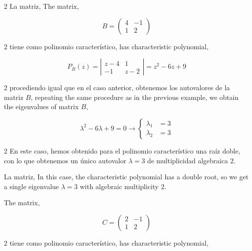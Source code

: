 \begin{paracol}{2}
La matriz,
\switchcolumn
The matrix,
\end{paracol}
\begin{equation*}
B=\begin{pmatrix}
4& -1\\
1& 2
\end{pmatrix}
\end{equation*}
\begin{paracol}{2}
tiene como polinomio característico,
\switchcolumn
has characteristic polynomial, 
\end{paracol}
\begin{equation*}
P_B(z)=\left\vert\begin{matrix}
z-4& 1\\
-1& z-2 
\end{matrix} \right\vert=z^2-6z+9
\end{equation*}
\begin{paracol}{2}
procediendo igual que en el caso anterior, obtenemos los autovalores de la matriz $B$,
\switchcolumn
repeating the same procedure as in the previous example, we obtain the eigenvalues of matrix $B$,
\end{paracol}
\begin{equation*}
\lambda^2-6\lambda+9=0 \rightarrow \left\{ 
\begin{aligned}
\lambda_1&=3\\
\lambda_2&=3
\end{aligned}
\right.
\end{equation*}
\begin{paracol}{2}
En este caso, hemos obtenido para el polinomio característico una raíz doble, con lo que obtenemos un único autovalor $\lambda=3$ de multiplicidad algebraica $2$.

La matriz,
\switchcolumn
In this case, the characteristic polynomial has a double root, so we get a single eigenvalue $\lambda=3$ with algebraic multiplicity $2$. 

The matrix,
\end{paracol}
\begin{equation*}
C=\begin{pmatrix}
2& -1\\
1& 2
\end{pmatrix}
\end{equation*}
\begin{paracol}{2}
tiene como polinomio característico,
\switchcolumn
has characteristic polynomial,
\end{paracol}
